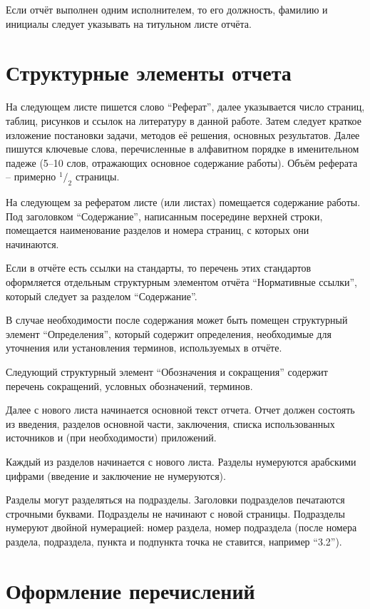 \documentclass[utf8,14pt, coursreport]{G7-32}
\begin{document}
Если отчёт выполнен одним исполнителем, то его должность, фамилию и инициалы следует указывать на титульном листе отчёта.

\section{Структурные элементы отчета}

На следующем листе пишется слово ``Реферат'', далее указывается число страниц, таблиц, рисунков и ссылок на литературу в данной работе. Затем следует краткое изложение постановки задачи, методов её решения, основных результатов. Далее пишутся ключевые слова, перечисленные в алфавитном порядке в именительном падеже (5--10 слов, отражающих основное содержание работы). Объём реферата -- примерно $^1/_2$ страницы.

На следующем за рефератом листе (или листах) помещается содержание работы. Под заголовком ``Содержание'', написанным посередине верхней строки, помещается наименование разделов и номера страниц, с которых они начинаются.

Если в отчёте есть ссылки на стандарты, то перечень этих стандартов оформляется отдельным структурным элементом отчёта ``Нормативные ссылки'', который следует за разделом ``Содержание''.

В случае необходимости после содержания может быть помещен структурный элемент ``Определения'', который содержит определения, необходимые для уточнения или установления терминов, используемых в отчёте.

Следующий структурный элемент ``Обозначения и сокращения'' содержит перечень сокращений, условных обозначений, терминов.

Далее с нового листа начинается основной текст отчета. Отчет должен состоять из введения, разделов основной части, заключения, списка использованных источников и (при необходимости) приложений.

Каждый из разделов начинается с нового листа. Разделы нумеруются арабскими цифрами (введение и заключение не нумеруются).

Разделы могут разделяться на подразделы. Заголовки подразделов печатаются строчными буквами. Подразделы не начинают с новой страницы. Подразделы нумеруют двойной нумерацией: номер раздела, номер подраздела (после номера раздела, подраздела, пункта и подпункта точка не ставится, например ``3.2'').

\section{Оформление перечислений}
\end{document}
